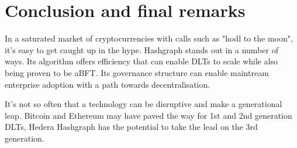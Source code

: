 \section{Conclusion and final remarks}

In a saturated market of cryptocurrencies with calls such as "hodl to the moon", it's easy to get caught up in the hype. Hashgraph stands out in a number of ways. Its algorithm offers efficiency that can enable DLTs to scale while also being proven to be aBFT. Its governance structure can enable maintream enterprise adoption with a path towards decentralisation.

It's not so often that a technology can be disruptive and make a generational leap. Bitcoin and Ethereum may have paved the way for 1st and 2nd generation DLTs, Hedera Hashgraph has the potential to take the lead on the 3rd generation.
